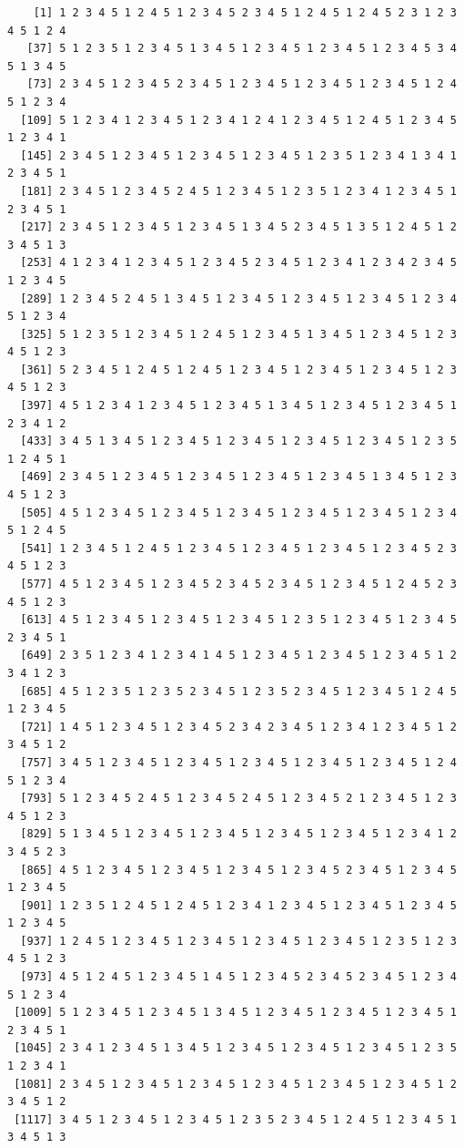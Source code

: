 \documentclass[
  11pt,
]{book}
\begin{document}
\begin{verbatim}
    [1] 1 2 3 4 5 1 2 4 5 1 2 3 4 5 2 3 4 5 1 2 4 5 1 2 4 5 2 3 1 2 3 4 5 1 2 4
   [37] 5 1 2 3 5 1 2 3 4 5 1 3 4 5 1 2 3 4 5 1 2 3 4 5 1 2 3 4 5 3 4 5 1 3 4 5
   [73] 2 3 4 5 1 2 3 4 5 2 3 4 5 1 2 3 4 5 1 2 3 4 5 1 2 3 4 5 1 2 4 5 1 2 3 4
  [109] 5 1 2 3 4 1 2 3 4 5 1 2 3 4 1 2 4 1 2 3 4 5 1 2 4 5 1 2 3 4 5 1 2 3 4 1
  [145] 2 3 4 5 1 2 3 4 5 1 2 3 4 5 1 2 3 4 5 1 2 3 5 1 2 3 4 1 3 4 1 2 3 4 5 1
  [181] 2 3 4 5 1 2 3 4 5 2 4 5 1 2 3 4 5 1 2 3 5 1 2 3 4 1 2 3 4 5 1 2 3 4 5 1
  [217] 2 3 4 5 1 2 3 4 5 1 2 3 4 5 1 3 4 5 2 3 4 5 1 3 5 1 2 4 5 1 2 3 4 5 1 3
  [253] 4 1 2 3 4 1 2 3 4 5 1 2 3 4 5 2 3 4 5 1 2 3 4 1 2 3 4 2 3 4 5 1 2 3 4 5
  [289] 1 2 3 4 5 2 4 5 1 3 4 5 1 2 3 4 5 1 2 3 4 5 1 2 3 4 5 1 2 3 4 5 1 2 3 4
  [325] 5 1 2 3 5 1 2 3 4 5 1 2 4 5 1 2 3 4 5 1 3 4 5 1 2 3 4 5 1 2 3 4 5 1 2 3
  [361] 5 2 3 4 5 1 2 4 5 1 2 4 5 1 2 3 4 5 1 2 3 4 5 1 2 3 4 5 1 2 3 4 5 1 2 3
  [397] 4 5 1 2 3 4 1 2 3 4 5 1 2 3 4 5 1 3 4 5 1 2 3 4 5 1 2 3 4 5 1 2 3 4 1 2
  [433] 3 4 5 1 3 4 5 1 2 3 4 5 1 2 3 4 5 1 2 3 4 5 1 2 3 4 5 1 2 3 5 1 2 4 5 1
  [469] 2 3 4 5 1 2 3 4 5 1 2 3 4 5 1 2 3 4 5 1 2 3 4 5 1 3 4 5 1 2 3 4 5 1 2 3
  [505] 4 5 1 2 3 4 5 1 2 3 4 5 1 2 3 4 5 1 2 3 4 5 1 2 3 4 5 1 2 3 4 5 1 2 4 5
  [541] 1 2 3 4 5 1 2 4 5 1 2 3 4 5 1 2 3 4 5 1 2 3 4 5 1 2 3 4 5 2 3 4 5 1 2 3
  [577] 4 5 1 2 3 4 5 1 2 3 4 5 2 3 4 5 2 3 4 5 1 2 3 4 5 1 2 4 5 2 3 4 5 1 2 3
  [613] 4 5 1 2 3 4 5 1 2 3 4 5 1 2 3 4 5 1 2 3 5 1 2 3 4 5 1 2 3 4 5 2 3 4 5 1
  [649] 2 3 5 1 2 3 4 1 2 3 4 1 4 5 1 2 3 4 5 1 2 3 4 5 1 2 3 4 5 1 2 3 4 1 2 3
  [685] 4 5 1 2 3 5 1 2 3 5 2 3 4 5 1 2 3 5 2 3 4 5 1 2 3 4 5 1 2 4 5 1 2 3 4 5
  [721] 1 4 5 1 2 3 4 5 1 2 3 4 5 2 3 4 2 3 4 5 1 2 3 4 1 2 3 4 5 1 2 3 4 5 1 2
  [757] 3 4 5 1 2 3 4 5 1 2 3 4 5 1 2 3 4 5 1 2 3 4 5 1 2 3 4 5 1 2 4 5 1 2 3 4
  [793] 5 1 2 3 4 5 2 4 5 1 2 3 4 5 2 4 5 1 2 3 4 5 2 1 2 3 4 5 1 2 3 4 5 1 2 3
  [829] 5 1 3 4 5 1 2 3 4 5 1 2 3 4 5 1 2 3 4 5 1 2 3 4 5 1 2 3 4 1 2 3 4 5 2 3
  [865] 4 5 1 2 3 4 5 1 2 3 4 5 1 2 3 4 5 1 2 3 4 5 2 3 4 5 1 2 3 4 5 1 2 3 4 5
  [901] 1 2 3 5 1 2 4 5 1 2 4 5 1 2 3 4 1 2 3 4 5 1 2 3 4 5 1 2 3 4 5 1 2 3 4 5
  [937] 1 2 4 5 1 2 3 4 5 1 2 3 4 5 1 2 3 4 5 1 2 3 4 5 1 2 3 5 1 2 3 4 5 1 2 3
  [973] 4 5 1 2 4 5 1 2 3 4 5 1 4 5 1 2 3 4 5 2 3 4 5 2 3 4 5 1 2 3 4 5 1 2 3 4
 [1009] 5 1 2 3 4 5 1 2 3 4 5 1 3 4 5 1 2 3 4 5 1 2 3 4 5 1 2 3 4 5 1 2 3 4 5 1
 [1045] 2 3 4 1 2 3 4 5 1 3 4 5 1 2 3 4 5 1 2 3 4 5 1 2 3 4 5 1 2 3 5 1 2 3 4 1
 [1081] 2 3 4 5 1 2 3 4 5 1 2 3 4 5 1 2 3 4 5 1 2 3 4 5 1 2 3 4 5 1 2 3 4 5 1 2
 [1117] 3 4 5 1 2 3 4 5 1 2 3 4 5 1 2 3 5 2 3 4 5 1 2 4 5 1 2 3 4 5 1 3 4 5 1 3

\end{verbatim}
\end{document}
